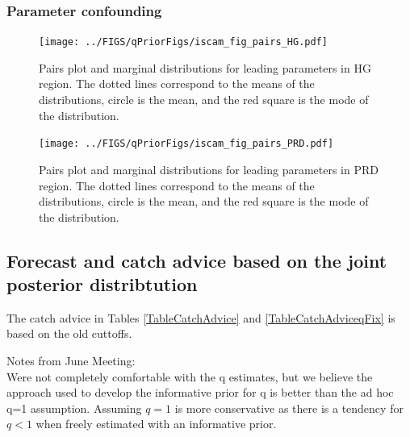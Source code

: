 \subsubsection{Parameter confounding}

\begin{figure}[!tbp]
	\texttt{[image: ../FIGS/qPriorFigs/iscam\_fig\_pairs\_HG.pdf]}\\
	\caption{Pairs plot and marginal distributions for leading parameters in HG region.  The dotted lines correspond to the means of the distributions, circle is the mean, and the red square is the mode of the distribution.}\label{PartII:MCMC:pairsHG}
\end{figure}


\begin{figure}[!tbp]
	\texttt{[image: ../FIGS/qPriorFigs/iscam\_fig\_pairs\_PRD.pdf]}\\
	\caption{Pairs plot and marginal distributions for leading parameters in PRD region.  The dotted lines correspond to the means of the distributions, circle is the mean, and the red square is the mode of the distribution.}\label{PartII:MCMC:pairsPRD}
\end{figure}



\subsection{Forecast and catch advice based on the joint posterior distribtution} \label{Section:Forecast}
 The catch advice in Tables \ref{TableCatchAdvice} and \ref{TableCatchAdviceqFix} is based on the old cuttoffs.










Notes from June Meeting:\\
Were not completely comfortable with the q estimates, but we believe the approach used to develop the informative prior for q is better than the ad hoc q=1 assumption.  Assuming $q=1$ is more conservative as there is a tendency for $q<1$ when freely estimated with an informative prior.
